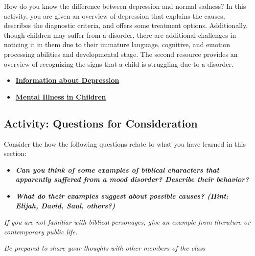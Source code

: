 \documentclass[
]{book}
\providecommand{\tightlist}{%
  \setlength{\itemsep}{0pt}\setlength{\parskip}{0pt}}
\begin{document}
\begin{reflect}
How do you know the difference between depression and normal sadness? In this activity, you are given an overview of depression that explains the causes, describes the diagnostic criteria, and offers some treatment options. Additionally, though children may suffer from a disorder, there are additional challenges in noticing it in them due to their immature language, cognitive, and emotion processing abilities and developmental stage. The second resource provides an overview of recognizing the signs that a child is struggling due to a disorder.

\begin{itemize}
\tightlist
\item
  \href{https://psychologyinfo.com/}{\textbf{Information about Depression}}\\
\item
  \href{https://www.mayoclinic.org/healthy-lifestyle/childrens-health/in-depth/mental-illness-in-children/art-20046577}{\textbf{Mental Illness in Children}}
\end{itemize}
\end{reflect}

\hypertarget{activity-questions-for-consideration-16}{%
\subsection*{Activity: Questions for Consideration}\label{activity-questions-for-consideration-16}}

\begin{reflect}
Consider the how the following questions relate to what you have learned in this section:

\begin{itemize}
\tightlist
\item
  \textbf{\emph{Can you think of some examples of biblical characters that apparently suffered from a mood disorder? Describe their behavior?}}\\
\item
  \textbf{\emph{What do their examples suggest about possible causes? (Hint: Elijah, David, Saul, others?)}}
\end{itemize}

\emph{If you are not familiar with biblical personages, give an example from literature or contemporary public life.}

\emph{Be prepared to share your thoughts with other members of the class}
\end{reflect}
\end{document}
